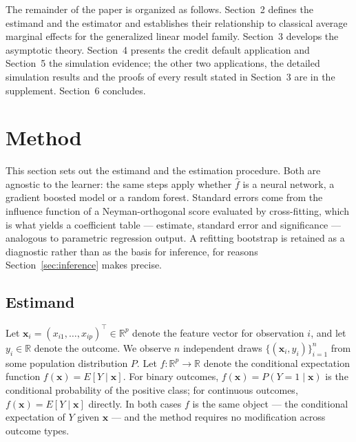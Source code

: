 \documentclass[12pt,a4paper]{article}
\numberwithin{equation}{section}
\theoremstyle{plain}
\theoremstyle{definition}
\begin{document}
	The remainder of the paper is organized as follows. Section~2 defines the
	estimand and the estimator and establishes their relationship to classical
	average marginal effects for the generalized linear model family. Section~3
	develops the asymptotic theory. Section~4 presents the credit default
	application and Section~5 the simulation evidence; the other two
	applications, the detailed simulation results and the proofs of every result
	stated in Section~3 are in the supplement. Section~6 concludes.
	
	\section{Method}
	
	This section sets out the estimand and the estimation procedure. Both are
	agnostic to the learner: the same steps apply whether $\hat{f}$ is a neural
	network, a gradient boosted model or a random forest. Standard errors come
	from the influence function of a Neyman-orthogonal score evaluated by
	cross-fitting, which is what yields a coefficient table --- estimate,
	standard error and significance --- analogous to parametric regression
	output. A refitting bootstrap is retained as a diagnostic rather than as the
	basis for inference, for reasons Section~\ref{sec:inference} makes precise.
	
	\subsection{Estimand}
	
	Let $\mathbf{x}_i = (x_{i1}, \dots, x_{ip})^\top \in \mathbb{R}^p$ denote the feature vector for observation $i$, and let $y_i \in \mathbb{R}$ denote the outcome. We observe $n$ independent draws $\{(\mathbf{x}_i, y_i)\}_{i=1}^n$ from some population distribution $P$. Let $f: \mathbb{R}^p \to \mathbb{R}$ denote the conditional expectation function $f(\mathbf{x}) = E[Y \mid \mathbf{x}]$. For binary outcomes, $f(\mathbf{x}) = P(Y = 1 \mid \mathbf{x})$ is the conditional probability of the positive class; for continuous outcomes, $f(\mathbf{x}) = E[Y \mid \mathbf{x}]$ directly. In both cases $f$ is the same object --- the conditional expectation of $Y$ given $\mathbf{x}$ --- and the method requires no modification across outcome types.
	
\end{document}
